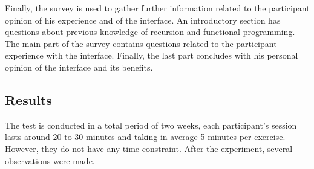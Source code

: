 Finally, the survey is used to gather further information related to
the participant opinion of his experience and of the interface. An
introductory section has questions about previous knowledge of
recursion and functional programming. The main part of the
survey contains questions related to the participant experience with
the interface. Finally, the last part concludes with his personal
opinion of the interface and its benefits.

\subsection{Results}

The test is conducted in a total period of two weeks, each
participant's session lasts around 20 to 30 minutes and taking in
average 5 minutes per exercise. However, they do not have any time
constraint. After the experiment, several observations were made.

